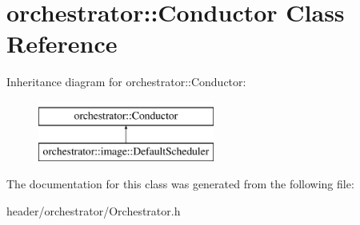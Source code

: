 \hypertarget{classorchestrator_1_1_conductor}{}\section{orchestrator\+:\+:Conductor Class Reference}
\label{classorchestrator_1_1_conductor}
Inheritance diagram for orchestrator\+:\+:Conductor\+:\begin{figure}[H]
\begin{center}
\leavevmode
\includegraphics[height=2.000000cm]{dd/d8e/classorchestrator_1_1_conductor}
\end{center}
\end{figure}


The documentation for this class was generated from the following file\+:\begin{DoxyCompactItemize}
\item 
header/orchestrator/Orchestrator.\+h\end{DoxyCompactItemize}
